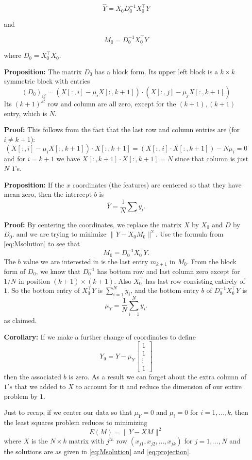 \documentclass[
]{article}
\begin{document}
\[ \hat{Y} = X_{0}D_{0}^{-1}X_{0}^{\intercal}Y \]

and

\[ M_{0} = D_{0}^{-1}X_{0}^{\intercal}Y \]

where \(D_{0}=X_{0}^{\intercal}X_{0}.\)

\textbf{Proposition:} The matrix \(D_{0}\) has a block form. Its upper
left block is a \(k\times k\) symmetric block with entries
\[ (D_{0})_{ij} =
(X[:,i]-\mu_{i}X[:,k+1])\cdot(X[:,j]-\mu_{j}X[:,k+1]) \] Its
\((k+1)^{st}\) row and column are all zero, except for the
\((k+1),(k+1)\) entry, which is \(N\).

\textbf{Proof:} This follows from the fact that the last row and column
entries are (for \(i\not=k+1\)): \[ (X[:,i]-\mu_{i}X[:,k+1])\cdot
X[:,k+1] = (X[:,i]\cdot X[:,k+1])-N\mu_{i} = 0 \] and for \(i=k+1\) we
have \(X[:,k+1]\cdot X[:,k+1]=N\) since that column is just \(N\)
\(1\)'s.

\textbf{Proposition:} If the \(x\) coordinates (the features) are
centered so that they have mean zero, then the intercept \(b\) is
\[ \overline{Y} =
\frac{1}{N}\sum y_{i}.  \]

\textbf{Proof:} By centering the coordinates, we replace the matrix
\(X\) by \(X_{0}\) and \(D\) by \(D_{0}\). and we are trying to minimize
\(\|Y-X_{0}M_{0}\|^2\). Use the formula from \cref{eq:Msolution} to see
that \[ M_{0} = D_{0}^{-1}X_{0}^{\intercal}Y.  \] The \(b\) value we are
interested in is the last entry \(m_{k+1}\) in \(M_{0}\). From the block
form of \(D_{0}\), we know that \(D_{0}^{-1}\) has bottom row and last
column zero except for \(1/N\) in position \((k+1)\times(k+1)\). Also
\(X_{0}^{\intercal}\) has last row consisting entirely of \(1\). So the
bottom entry of \(X_{0}^{\intercal}Y\) is \(\sum_{i=1}^{N} y_{i}\), and
the bottom entry \(b\) of \(D_{0}^{-1}X_{0}^{\intercal}Y\) is
\[ \mu_{Y} =
\frac{1}{N}\sum_{i=1}^{N} y_{i}.  \] as claimed.

\textbf{Corollary:} If we make a further change of coordinates to define
\[
Y_{0} = Y - \mu_{Y}\left[\begin{matrix} 1 \\ 1 \\ \vdots \\
1\end{matrix}\right] \] then the associated \(b\) is zero. As a result
we can forget about the extra column of \(1's\) that we added to \(X\)
to account for it and reduce the dimension of our entire problem by
\(1\).

Just to recap, if we center our data so that \(\mu_{Y}=0\) and
\(\mu_{i}=0\) for \(i=1,\ldots, k\), then the least squares problem
reduces to minimizing \[ E(M) = \|Y-XM\|^2 \] where \(X\) is the
\(N\times k\) matrix with \(j^{th}\) row
\((x_{j1},x_{j2},\ldots, x_{jk})\) for \(j=1,\ldots, N\) and the
solutions are as given in \cref{eq:Msolution} and \cref{eq:projection}.
\end{document}

